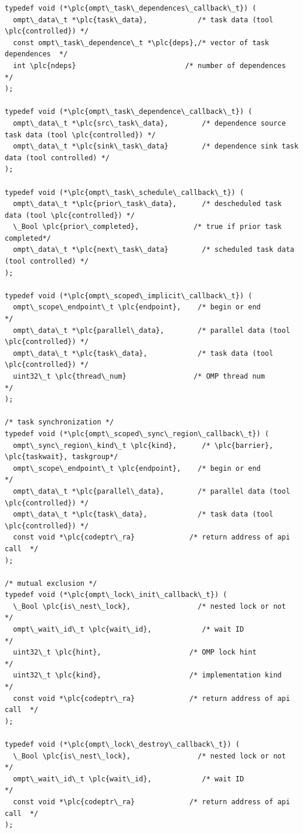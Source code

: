 \documentclass{article}
\begin{document}
\begin{boxedcode}
\begin{verbatim}
typedef void (*\plc{ompt\_task\_dependences\_callback\_t}) (                                   
  ompt\_data\_t *\plc{task\_data},            /* task data (tool \plc{controlled}) */
  const ompt\_task\_dependence\_t *\plc{deps},/* vector of task dependences  */
  int \plc{ndeps}                          /* number of dependences       */
);

typedef void (*\plc{ompt\_task\_dependence\_callback\_t}) (
  ompt\_data\_t *\plc{src\_task\_data},        /* dependence source task data (tool \plc{controlled}) */
  ompt\_data\_t *\plc{sink\_task\_data}        /* dependence sink task data (tool controlled) */
);

typedef void (*\plc{ompt\_task\_schedule\_callback\_t}) (
  ompt\_data\_t *\plc{prior\_task\_data},      /* descheduled task data (tool \plc{controlled}) */
  \_Bool \plc{prior\_completed},             /* true if prior task completed*/
  ompt\_data\_t *\plc{next\_task\_data}        /* scheduled task data (tool controlled) */
);

typedef void (*\plc{ompt\_scoped\_implicit\_callback\_t}) ( 
  ompt\_scope\_endpoint\_t \plc{endpoint},    /* begin or end                */
  ompt\_data\_t *\plc{parallel\_data},        /* parallel data (tool \plc{controlled}) */
  ompt\_data\_t *\plc{task\_data},            /* task data (tool \plc{controlled}) */
  uint32\_t \plc{thread\_num}                /* OMP thread num              */
);

/* task synchronization */
typedef void (*\plc{ompt\_scoped\_sync\_region\_callback\_t}) ( 
  ompt\_sync\_region\_kind\_t \plc{kind},      /* \plc{barrier}, \plc{taskwait}, taskgroup*/
  ompt\_scope\_endpoint\_t \plc{endpoint},    /* begin or end                */ 
  ompt\_data\_t *\plc{parallel\_data},        /* parallel data (tool \plc{controlled}) */
  ompt\_data\_t *\plc{task\_data},            /* task data (tool \plc{controlled}) */
  const void *\plc{codeptr\_ra}             /* return address of api call  */
);

/* mutual exclusion */
typedef void (*\plc{ompt\_lock\_init\_callback\_t}) (
  \_Bool \plc{is\_nest\_lock},                /* nested lock or not          */
  ompt\_wait\_id\_t \plc{wait\_id},            /* wait ID                     */
  uint32\_t \plc{hint},                     /* OMP lock hint               */
  uint32\_t \plc{kind},                     /* implementation kind         */
  const void *\plc{codeptr\_ra}             /* return address of api call  */
);

typedef void (*\plc{ompt\_lock\_destroy\_callback\_t}) (
  \_Bool \plc{is\_nest\_lock},                /* nested lock or not          */
  ompt\_wait\_id\_t \plc{wait\_id},            /* wait ID                     */
  const void *\plc{codeptr\_ra}             /* return address of api call  */
);


\end{verbatim}
\end{boxedcode}
\end{document}
